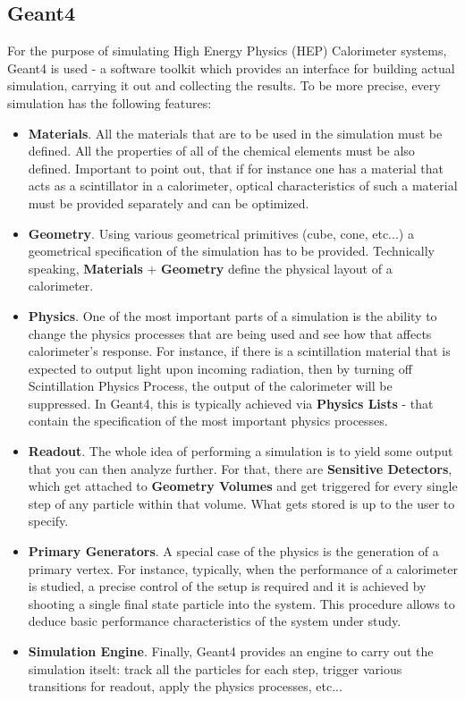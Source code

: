 \subsection{Geant4} \label{subsection:simulations_introduction_geant4}
For the purpose of simulating High Energy Physics (HEP) Calorimeter systems, {\sc Geant4} \cite{Geant4-1,Geant4-2} is used - a software toolkit which provides an interface for building actual simulation, carrying it out and collecting the results. To be more precise, every simulation has the following features:
\begin{itemize}
    \item \textbf{Materials}. All the materials that are to be used in the simulation must be defined. All the properties of all of the chemical elements must be also defined. Important to point out, that if for instance one has a material that acts as a scintillator in a calorimeter, optical characteristics of such a material must be provided separately and can be optimized.
    \item \textbf{Geometry}. Using various geometrical primitives (cube, cone, etc...) a geometrical specification of the simulation has to be provided. Technically speaking, \textbf{Materials} $+$ \textbf{Geometry} define the physical layout of a calorimeter.
    \item \textbf{Physics}. One of the most important parts of a simulation is the ability to change the physics processes that are being used and see how that affects calorimeter's response. For instance, if there is a scintillation material that is expected to output light upon incoming radiation, then by turning off Scintillation Physics Process, the output of the calorimeter will be suppressed. In {\sc Geant4}, this is typically achieved via \textbf{Physics Lists} - that contain the specification of the most important physics processes.
    \item \textbf{Readout}. The whole idea of performing a simulation is to yield some output that you can then analyze further. For that, there are \textbf{Sensitive Detectors}, which get attached to \textbf{Geometry Volumes} and get triggered for every single step of any particle within that volume. What gets stored is up to the user to specify.
    \item \textbf{Primary Generators}. A special case of the physics is the generation of a primary vertex. For instance, typically, when the performance of a calorimeter is studied, a precise control of the setup is required and it is achieved by shooting a single final state particle into the system. This procedure allows to deduce basic performance characteristics of the system under study.
    \item \textbf{Simulation Engine}. Finally, {\sc Geant4} provides an engine to carry out the simulation itselt: track all the particles for each step, trigger various transitions for readout, apply the physics processes, etc...
\end{itemize}
